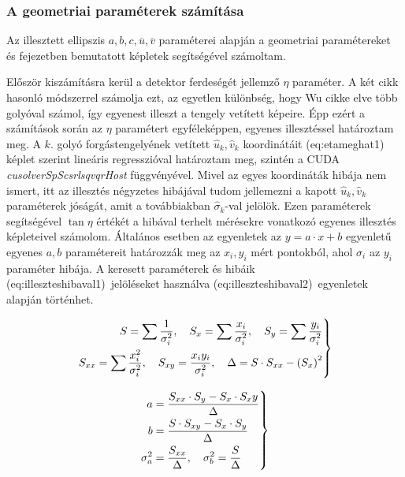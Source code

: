 \documentclass[a4paper,12pt]{article}
\begin{document}
\subsubsection{A geometriai paraméterek számítása}

Az illesztett ellipszis  $a,b,c,\overline{u},\overline{v}$ paraméterei alapján a geometriai paramétereket   és  fejezetben bemutatott képletek segítségével számoltam.

Először kiszámításra kerül a detektor ferdeségét jellemző $\eta$ paraméter. A két cikk hasonló módszerrel számolja ezt, az egyetlen különbség, hogy Wu cikke elve több golyóval számol, így egyenest illeszt a tengely vetített képeire. Épp ezért a számítások során az $\eta$ paramétert egyféleképpen, egyenes illesztéssel határoztam meg. A $k$. golyó forgástengelyének vetített  $\hat{u}_k, \hat{v}_k$ koordinátáit \aref({eq:etameghat1}) képlet szerint lineáris regresszióval határoztam meg, szintén a CUDA \emph{cusolverSpScsrlsqvqrHost} függvényével. Mivel az egyes koordináták hibája nem ismert, itt az illesztés négyzetes hibájával tudom jellemezni a kapott  $\hat{u}_k, \hat{v}_k$  paraméterek jóságát, amit a továbbiakban $\hat{\sigma}_k$-val jelölök.  Ezen paraméterek segítségével $\tan \eta$ értékét a hibával terhelt mérésekre vonatkozó egyenes illesztés képleteivel számolom. Általános esetben az egyenletek az $y=a\cdot x + b$ egyenletű egyenes $a,b$ paramétereit határozzák meg az $x_i,y_i$ mért pontokból, ahol $\sigma_i$ az $y_i$ paraméter hibája. A keresett paraméterek és hibáik \aref({eq:illeszteshibaval1})~jelöléseket használva \aref({eq:illeszteshibaval2})~egyenletek alapján történhet. 


\begin{equation}
\label{eq:illeszteshibaval1}
\left .
\begin{split}
S = \sum \frac{1}{\sigma_i^2}, \hskip10pt S_x = \sum \frac{x_i}{\sigma_i^2}, \hskip10pt S_y = \sum \frac{y_i}{\sigma_i^2} \\
 S_{xx} = \sum \frac{x_i^2}{\sigma_i^2}, \hskip10pt S_{xy} = \frac{x_iy_i}{\sigma_i^2}, \hskip10pt \Delta = S\cdot S_{xx}  - \left(S_x \right) ^2
 \end{split}
 \right \}
\end{equation}

\begin{equation}
\label{eq:illeszteshibaval2}
\left .
\begin{split}
a&=\frac{S_{xx} \cdot S_y - S_x \cdot S_xy }{\Delta}\\
b&=\frac{S\cdot S_{xy} - S_x \cdot S_y}{\Delta}\\
\sigma_a^2 & = \frac{S_{xx}}{\Delta },  \hskip10pt \sigma_b^2 = \frac{S}{\Delta}
\end{split}
\right \}
\end{equation}
\end{document}
